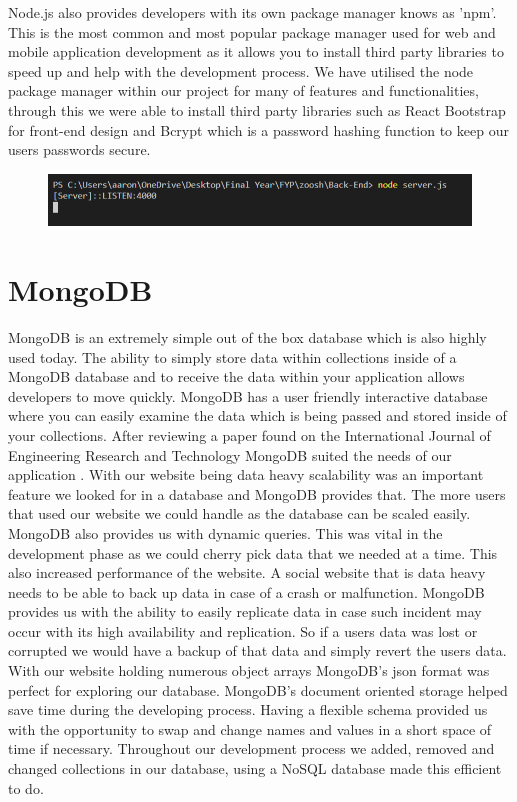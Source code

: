 Node.js also provides developers with its own package manager knows as 'npm'. This is the most common and most popular package manager used for web and mobile application development as it allows you to install third party libraries to speed up and help with the development process. We have utilised the node package manager within our project for many of features and functionalities, through this we were able to install third party libraries such as React Bootstrap for front-end design and Bcrypt which is a password hashing function to keep our users passwords secure.

\begin{figure}[H]
  \centering
  \includegraphics[scale=0.55]{img/server.PNG}
  \label{fig:NodeJS Server running.}
\end{figure}

\section{MongoDB}
MongoDB is an extremely simple out of the box database which is also highly used today. The ability to simply store data within collections inside of a MongoDB database and to receive the data within your application allows developers to move quickly. MongoDB has a user friendly interactive database where you can easily examine the data which is being passed and stored inside of your collections.
After reviewing a paper found on the International Journal of Engineering Research and Technology MongoDB suited the needs of our application \cite{chauhan2019review}. With our website being data heavy scalability was an important feature we looked for in a database and MongoDB provides that. The more users that used our website we could handle as the database can be scaled easily. MongoDB also provides us with dynamic queries. This was vital in the development phase as we could cherry pick data that we needed at a time. This also increased performance of the website. A social website that is data heavy needs to be able to back up data in case of a crash or malfunction. MongoDB provides us with the ability to easily replicate data in case such incident may occur with its high availability and replication. So if a users data was lost or corrupted we would have a backup of that data and simply revert the users data.
With our website holding numerous object arrays MongoDB's json format was perfect for exploring our database. MongoDB's document oriented storage helped save time during the developing process\cite{MongoDB}.
Having a flexible schema provided us with the opportunity to swap and change names and values in a short space of time if necessary. Throughout our development process we added, removed and changed collections in our database, using a NoSQL database made this efficient to do.


